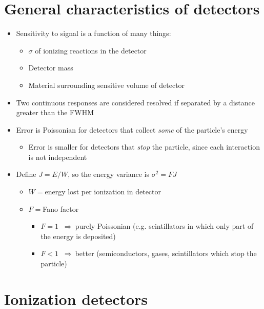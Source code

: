 \documentclass[11pt]{article}
\newcommand{\thus}{$~\Rightarrow~$}
\begin{document}
\section{General characteristics of detectors}
\begin{itemize}
  \item Sensitivity to signal is a function of many things:
  \begin{itemize}
    \item $\sigma$ of ionizing reactions in the detector
    \item Detector mass
    \item Material surrounding sensitive volume of detector
  \end{itemize}
  \item Two continuous responses are considered resolved if separated by a distance greater than the FWHM
  \item Error is Poissonian for detectors that collect \emph{some} of the particle's energy
  \begin{itemize}
    \item Error is smaller for detectors that \emph{stop} the particle, since each interaction is not independent
  \end{itemize}
  \item Define $J=E/W$, so the energy variance is $\sigma^2=FJ$
  \begin{itemize}
    \item $W=$energy lost per ionization in detector
    \item $F=$Fano factor
    \begin{itemize}
      \item $F=1$ \thus purely Poissonian (e.g. scintillators in which only part of the energy is deposited)
      \item $F<1$ \thus better (semiconductors, gases, scintillators which stop the particle)
    \end{itemize}
  \end{itemize}
\end{itemize}

\section{Ionization detectors}
\end{document}
